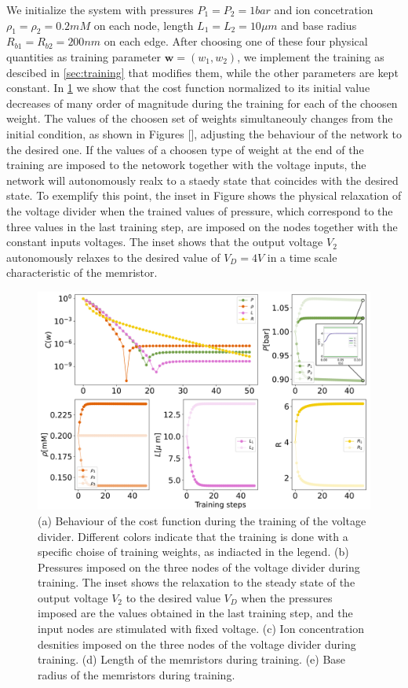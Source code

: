 \documentclass[reprint,superscriptaddress,prb,showkeys]{revtex4-2}
\newcommand{\brac}[1]{\left(#1 \right)} %
\begin{document}
We initialize the system with pressures $P_1 =  P_2 = 1 bar$ and ion concetration $\rho_1 = \rho_2 = 0.2 mM$ on each node, length $L_1 = L_2 = 10\mu m$ and base radius  $R_{b1} = R_{b2} = 200 nm$ on each edge. After choosing one of these four physical quantities as training parameter $\boldsymbol{w} = \brac{w_1, w_2}$, we implement the training as descibed in \cref{sec:training} that modifies them, while the other parameters are kept constant. 
In \cref{fig:mse_weights_vd} we show that the cost function normalized to its initial value decreases of many order of magnitude during the training for each of the choosen weight. The values of the choosen set of weights simultaneouly changes from the initial condition, as shown in Figures [], adjusting the behaviour of the network to the desired one. If the values of a choosen type of weight at the end of the training are imposed to the netowork together with the voltage inputs, the network will autonomously realx to a staedy state that coincides with the desired state. To exemplify this point, the inset in Figure shows the physical relaxation of the voltage divider when the trained values of pressure, which correspond to the three values in the last training step, are imposed on the nodes together with the constant inputs voltages. The inset shows that the output voltage $V_2$ autonomously relaxes to the desired value of $V_D=4V$ in a time scale characteristic of the memristor.

\begin{figure}[h]
    \centering
    \includegraphics[width=\columnwidth]{plots/voltage_divider/mse_weights_vd.pdf}
    \caption{(a) Behaviour of the cost function during the training of the voltage divider. Different colors indicate that the training is done with a specific choise of training weights, as indiacted in the legend. (b) Pressures imposed on the three nodes of the voltage divider during training. The inset shows the relaxation to the steady state of the output voltage $V_2$ to the desired value $V_D$ when the pressures imposed are the values obtained in the last training step, and the input nodes are stimulated with fixed voltage. (c) Ion concentration desnities imposed on the three nodes of the voltage divider during training. (d) Length of the memristors during training. (e) Base radius of the memristors during training.}\label{fig:mse_weights_vd}
\end{figure} 
\end{document}
